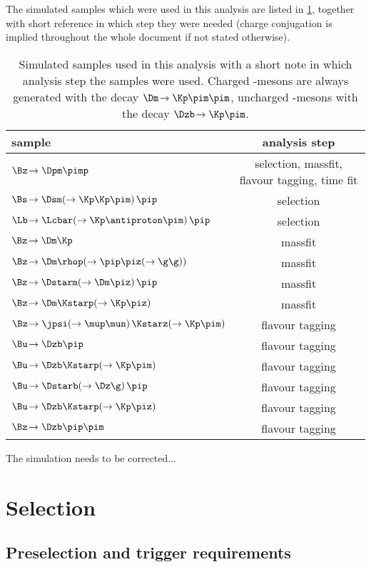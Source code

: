 The simulated samples which were used in this analysis are listed in \cref{tab:simSamples}, together with short reference in which step they were needed (charge conjugation is implied throughout the whole document if not stated otherwise).
\begin{table}[tbp]
	\centering
	\caption{Simulated samples used in this analysis with a short note in which analysis step the samples were used. Charged \D-mesons are always generated with the decay $\Dm\!\to\Kp\pim\pim$, uncharged \D-mesons with the decay $\Dzb\!\to\Kp\pim$.}
	\begin{tabular}{lc}
		\toprule
		sample & analysis step \\
		\midrule
		$\Bz\!\to\Dpm\pimp$ & selection, massfit, flavour tagging, time fit \\
		$\Bs\!\to\Dsm\!\left(\to\Kp\Kp\pim\right)\pip$ & selection \\
		$\Lb\!\to\Lcbar\!\left(\to\Kp\antiproton\pim\right)\pip$ & selection \\
		$\Bz\!\to\Dm\Kp$ & massfit \\
		$\Bz\!\to\Dm\rhop\!\left(\to\pip\piz\!\left(\to\g\g\right)\right)$ & massfit \\
		$\Bz\!\to\Dstarm\!\left(\to\Dm\piz\right)\pip$ & massfit \\
		$\Bz\!\to\Dm\Kstarp\!\left(\to\Kp\piz\right)$ & massfit \\
		$\Bz\!\to\jpsi\!\left(\to\mup\mun\right)\Kstarz\!\left(\to\Kp\pim\right)$ & flavour tagging \\
		$\Bu\!\to\Dzb\pip$ & flavour tagging \\
		$\Bu\!\to\Dzb\Kstarp\!\left(\to\Kp\pim\right)$ & flavour tagging \\
		$\Bu\!\to\Dstarb\!\left(\to\Dz\g\right)\pip$ & flavour tagging \\
		$\Bu\!\to\Dzb\Kstarp\!\left(\to\Kp\piz\right)$ & flavour tagging \\
		$\Bz\!\to\Dzb\pip\pim$ & flavour tagging \\
		\bottomrule
	\end{tabular}
	\label{tab:simSamples}
\end{table}
The simulation needs to be corrected...

\section{Selection}
\label{sec:selection}



\subsection{Preselection and trigger requirements}
\label{sec:preselTrigger}

